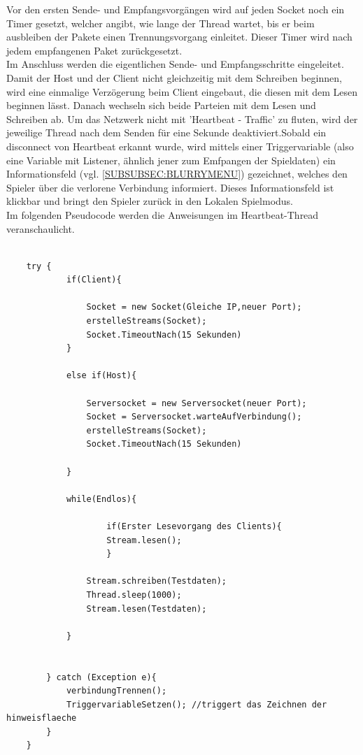 \documentclass[12pt,a4paper]{article}
\begin{document}
{Vor den ersten Sende- und Empfangsvorgängen wird auf jeden Socket noch ein Timer gesetzt, welcher angibt, wie lange der Thread wartet, bis er beim ausbleiben der Pakete einen Trennungsvorgang einleitet. Dieser Timer wird nach jedem empfangenen Paket zurückgesetzt.\\
Im Anschluss werden die eigentlichen Sende- und Empfangsschritte eingeleitet. Damit der Host und der Client nicht gleichzeitig mit dem Schreiben beginnen, wird eine einmalige Verzögerung beim Client eingebaut, die diesen mit dem Lesen beginnen lässt. Danach wechseln sich beide Parteien mit dem Lesen und Schreiben ab. Um das Netzwerk nicht mit 'Heartbeat - Traffic' zu fluten, wird der jeweilige Thread nach dem Senden für eine Sekunde deaktiviert.Sobald ein disconnect von Heartbeat erkannt wurde, wird mittels einer Triggervariable (also eine Variable mit Listener, ähnlich jener zum Emfpangen der Spieldaten) ein Informationsfeld (vgl. \ref{SUBSUBSEC:BLURRYMENU}) gezeichnet, welches den Spieler über die verlorene Verbindung informiert. Dieses Informationsfeld ist klickbar und bringt den Spieler zurück in den Lokalen Spielmodus.\\[2ex]
Im folgenden Pseudocode werden die Anweisungen im Heartbeat-Thread veranschaulicht.

\lstset{language=java}
\begin{lstlisting}

	try {
			if(Client){
	
				Socket = new Socket(Gleiche IP,neuer Port);
				erstelleStreams(Socket);
				Socket.TimeoutNach(15 Sekunden)
			}

			else if(Host){

				Serversocket = new Serversocket(neuer Port);
				Socket = Serversocket.warteAufVerbindung();
				erstelleStreams(Socket);
				Socket.TimeoutNach(15 Sekunden)

			}
			
			while(Endlos){

					if(Erster Lesevorgang des Clients){					
					Stream.lesen();
					}

				Stream.schreiben(Testdaten);
				Thread.sleep(1000);
				Stream.lesen(Testdaten);

			}


		} catch (Exception e){
			verbindungTrennen();
			TriggervariableSetzen(); //triggert das Zeichnen der hinweisflaeche
		}
	}
\end{lstlisting}




\newpage

}
\end{document}
